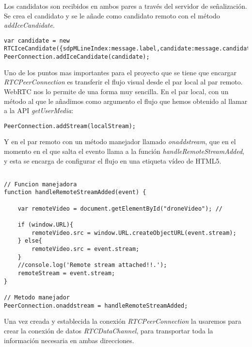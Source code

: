 Los candidatos son recibidos en ambos pares a través del servidor de señalización. Se crea el candidato y se le añade como candidato remoto con el método \emph{addIceCandidate}.\\

\begin{lstlisting}[caption=Manejador de los Candidatos ICE remotos.]
var candidate = new RTCIceCandidate({sdpMLineIndex:message.label,candidate:message.candidate});
PeerConnection.addIceCandidate(candidate);
\end{lstlisting}


Uno de los puntos mas importantes para el proyecto que se tiene que encargar \emph{RTCPeerConnection} es transferir el flujo visual desde el par local al par remoto. WebRTC nos lo permite de una forma muy sencilla. En el par local, con un método al que le añadimos como argumento el flujo que hemos obtenido al llamar a la API \emph{getUserMedia}:\\

\begin{lstlisting}[caption=Manejador del flujo audiovisual en el par local.]
PeerConnection.addStream(localStream); 
\end{lstlisting}

Y en el par remoto con un método manejador llamado \emph{onaddstream}, que en el momento en el que salta el evento llama a la función \emph{handleRemoteStreamAdded}, y esta se encarga de configurar el flujo en una etiqueta vídeo de HTML5.\\

\begin{lstlisting}[caption=Manejador del flujo audiovisual en el par remoto.]

// Funcion manejadora
function handleRemoteStreamAdded(event) {

    var remoteVideo = document.getElementById("droneVideo"); // 

	if (window.URL){
		remoteVideo.src = window.URL.createObjectURL(event.stream);
	} else{
		remoteVideo.src = event.stream;
	}
    //console.log('Remote stream attached!!.');
	remoteStream = event.stream;
}

// Metodo manejador 
PeerConnection.onaddstream = handleRemoteStreamAdded;
\end{lstlisting}

Una vez creada y establecida la conexión \emph{RTCPeerConnection} la usaremos para crear la conexión de datos \emph{RTCDataChannel}, para transportar toda la información necesaria en ambas direcciones.\\


